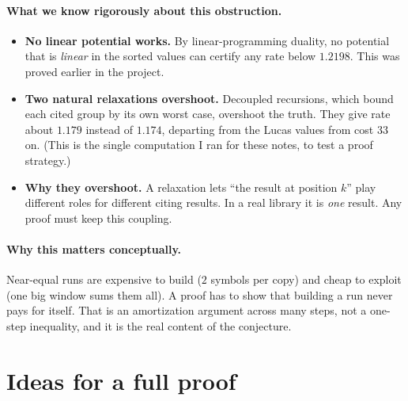 \documentclass[11pt]{article}
\theoremstyle{remark}
\begin{document}
\paragraph{What we know rigorously about this obstruction.}
\begin{itemize}
\item \textbf{No linear potential works.} By linear-programming duality, no potential
  that is \emph{linear} in the sorted values can certify any rate below $1.2198$. This
  was proved earlier in the project.
\item \textbf{Two natural relaxations overshoot.} Decoupled recursions, which bound each
  cited group by its own worst case, overshoot the truth. They give rate about $1.179$
  instead of $1.174$, departing from the Lucas values from cost $33$ on. (This is the
  single computation I ran for these notes, to test a proof strategy.)
\item \textbf{Why they overshoot.} A relaxation lets ``the result at position $k$'' play
  different roles for different citing results. In a real library it is \emph{one}
  result. Any proof must keep this coupling.
\end{itemize}

\paragraph{Why this matters conceptually.} Near-equal runs are expensive to build ($2$
symbols per copy) and cheap to exploit (one big window sums them all). A proof has to show
that building a run never pays for itself. That is an amortization argument across many
steps, not a one-step inequality, and it is the real content of the conjecture.

\section{Ideas for a full proof}
\end{document}
